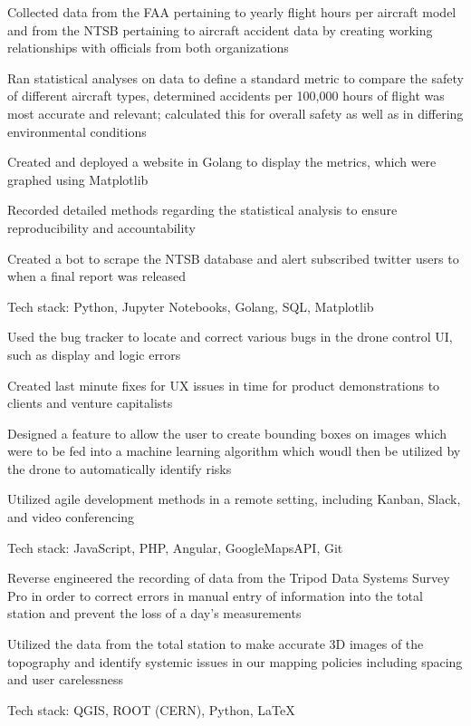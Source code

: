 \documentclass[letterpaper]{resume}
\begin{document}
\begin{compactitem}
\item Collected data from the FAA pertaining to yearly flight hours per aircraft model and from the NTSB pertaining to aircraft accident data by creating working relationships with officials from both organizations
\item Ran statistical analyses on data to define a standard metric to compare the safety of different aircraft types, determined accidents per 100,000 hours of flight was most accurate and relevant; calculated this for overall safety as well as in differing environmental conditions
\item Created and deployed a website in Golang to display the metrics, which were graphed using Matplotlib
\item Recorded detailed methods regarding the statistical analysis to ensure reproducibility and accountability
\item Created a bot to scrape the NTSB database and alert subscribed twitter users to when a final report was released
\item Tech stack: Python, Jupyter Notebooks, Golang, SQL, Matplotlib
\end{compactitem}

\begin{compactitem}
\item Used the bug tracker to locate and correct various bugs in the drone control UI, such as display and logic errors
\item Created last minute fixes for UX issues in time for product demonstrations to clients and venture capitalists
\item Designed a feature to allow the user to create bounding boxes on images which were to be fed into a machine learning algorithm which woudl then be utilized by the drone to automatically identify risks
\item Utilized agile development methods in a remote setting, including Kanban, Slack, and video conferencing
\item Tech stack: JavaScript, PHP, Angular, GoogleMapsAPI, Git
\end{compactitem}

\begin{compactitem}
\item Reverse engineered the recording of data from the Tripod Data Systems Survey Pro in order to correct errors in manual entry of information into the total station and prevent the loss of a day's measurements
\item Utilized the data from the total station to make accurate 3D images of the topography and identify systemic issues in our mapping policies including spacing and user carelessness
\item Tech stack: QGIS, ROOT (CERN), Python, LaTeX
\end{compactitem}
\end{document}
